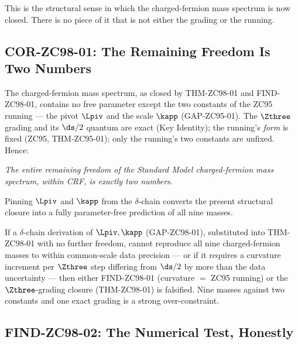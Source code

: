\documentclass[12pt, a4paper]{article}
\begin{document}
This is the structural sense in which the charged-fermion mass spectrum is now
closed. There is no piece of it that is not either the grading or the running.

\subsection{COR-ZC98-01: The Remaining Freedom Is Two Numbers}
\label{sec:twoconstants-zc98}

\begin{formalbox}[title={COR-ZC98-01: The Spectrum Is Parameter-Free Except
  for Two Constants}]
The charged-fermion mass spectrum, as closed by THM-ZC98-01 and FIND-ZC98-01,
contains no free parameter except the two constants of the ZC95 running --- the
pivot $\Lpiv$ and the scale $\kapp$ (GAP-ZC95-01). The $\Zthree$ grading and its
$\ds/2$ quantum are exact (Key Identity); the running's \emph{form} is fixed
(ZC95, THM-ZC95-01); only the running's two constants are unfixed. Hence:

\smallskip
\emph{The entire remaining freedom of the Standard Model charged-fermion mass
spectrum, within CRF, is exactly two numbers.}

\smallskip
Pinning $\Lpiv$ and $\kapp$ from the $\delta$-chain converts the present
structural closure into a fully parameter-free prediction of all nine masses.
\end{formalbox}

\begin{fsbox}[title={FS-M-04: Falsification Signature for the Spectral Closure}]
If a $\delta$-chain derivation of $\Lpiv,\kapp$ (GAP-ZC98-01), substituted into
THM-ZC98-01 with no further freedom, cannot reproduce all nine charged-fermion
masses to within common-scale data precision --- or if it requires a curvature
increment per $\Zthree$ step differing from $\ds/2$ by more than the data
uncertainty --- then either FIND-ZC98-01 (curvature $=$ ZC95 running) or the
$\Zthree$-grading closure (THM-ZC98-01) is falsified. Nine masses against two
constants and one exact grading is a strong over-constraint.
\end{fsbox}

\subsection{FIND-ZC98-02: The Numerical Test, Honestly}
\label{sec:numbers-zc98}
\end{document}
